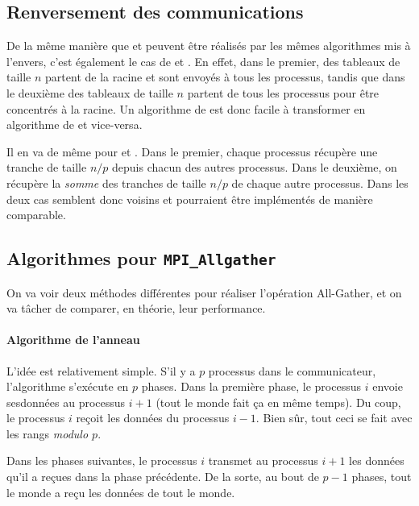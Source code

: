 
\subsection{Renversement des communications}

De la même manière que  et  peuvent
être réalisés par les mêmes algorithmes \og mis à l'envers\fg, c'est
également le cas de  et . En effet,
dans le premier, des tableaux de taille $n$ partent de la racine et
sont envoyés à tous les processus, tandis que dans le deuxième des
tableaux de taille $n$ partent de tous les processus pour être
concentrés à la racine. Un algorithme de  est donc
facile à transformer en algorithme de  et vice-versa.

Il en va de même pour  et
. Dans le premier, chaque processus récupère
une tranche de taille $n/p$ depuis chacun des autres processus. Dans
le deuxième, on récupère la \emph{somme} des tranches de taille $n/p$
de chaque autre processus. Dans les deux cas semblent donc voisins et
pourraient être implémentés de manière comparable.


\subsection{Algorithmes pour \texttt{MPI\_Allgather}}

On va voir deux méthodes différentes pour réaliser l'opération \og
All-Gather\fg, et on va tâcher de comparer, en théorie, leur performance.

\paragraph{Algorithme de l'anneau} L'idée est relativement
simple. S'il y a $p$ processus dans le communicateur, l'algorithme
s'exécute en $p$ phases. Dans la première phase, le processus $i$
envoie \og ses\fg données au processus $i+1$ (tout le monde fait ça en
même temps). Du coup, le processus $i$ reçoit les données du processus
$i-1$. Bien sûr, tout ceci se fait avec les rangs \emph{modulo $p$}.

Dans les phases suivantes, le processus $i$ transmet au processus
$i+1$ les données qu'il a reçues dans la phase précédente. De la
sorte, au bout de $p-1$ phases, tout le monde a reçu les données de tout
le monde.

